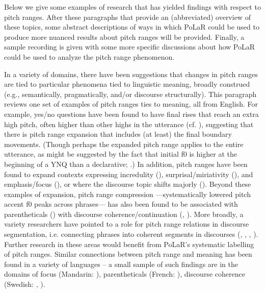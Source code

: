 \documentclass[11pt, twoside]{memoir}
\begin{document}
Below we give some examples of research that has yielded findings with respect to pitch ranges. After these paragraphs that provide an (abbreviated) overview of these topics, some abstract descriptions of ways in which PoLaR could be used to produce more nuanced results about pitch ranges will be provided. Finally, a sample recording is given with some more specific discussions about how PoLaR could be used to analyze the pitch range phenomenon.

In a variety of domains, there have been suggestions that changes in pitch ranges are tied to particular phenomena tied to linguistic meaning, broadly construed (e.g., semantically, pragmatically, and/or discourse structurally). This paragraph reviews one set of examples of pitch ranges ties to meaning, all from English. For example, yes/no questions have been found to have final rises that reach an extra high pitch, often higher than other highs in the utterance (cf. \citealt{pierrehumbert80}), suggesting that there is pitch range expansion that includes (at least) the final boundary movements. (Though perhaps the expanded pitch range applies to the entire utterance, as might be  suggested by the fact that initial f0 is higher at the beginning of a YNQ than a declarative; \citealt{sicoli-15}.) In addition, pitch ranges have been found to expand contexts expressing incredulity (\citealt{hirschbergward92}), surprisal\slash miriativity (\citealt{rett-20}), and emphasis\slash focus (\citealt{xuxu05}), or where the discourse topic shifts majorly (\citealt{hirschbergpierrehumbert86}). Beyond these examples of expansion, pitch range compression —systematically lowered pitch accent f0 peaks across phrases— has also been found to be associated with parentheticals (\citealt{price-91, dehe09}) with discourse coherence\slash continuation (\citealt{beckman93}, \citealt{bruce-97}). More broadly, a variety researchers have pointed to a role for pitch range relations in discourse segmentation, i.e. connecting phrases into coherent segments in discourses (\citealt{hirst93a}, \citealt{wichmann00}, \citealt{hirschberg04}, \citealt{lin-11}). Further research in these areas would benefit from PoLaR’s systematic labelling of pitch ranges.  Similar connections between pitch range and meaning has been found in a variety of languages – a small sample of such findings are in the domains of focus (Mandarin: \citealt{xu99}), parentheticals (French: \citealt{fagyal02}), discourse coherence (Swedish: \citealt{hansson03}, \citealt{carlson-05}).
\end{document}
